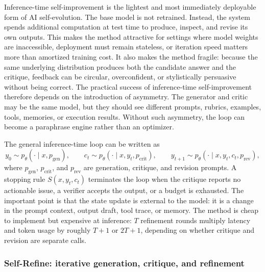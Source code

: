 Inference-time self-improvement is the lightest and most immediately deployable form of AI self-evolution. The base model is not retrained. Instead, the system spends additional computation at test time to produce, inspect, and revise its own outputs. This makes the method attractive for settings where model weights are inaccessible, deployment must remain stateless, or iteration speed matters more than amortized training cost. It also makes the method fragile: because the same underlying distribution produces both the candidate answer and the critique, feedback can be circular, overconfident, or stylistically persuasive without being correct. The practical success of inference-time self-improvement therefore depends on the introduction of asymmetry. The generator and critic may be the same model, but they should see different prompts, rubrics, examples, tools, memories, or execution results. Without such asymmetry, the loop can become a paraphrase engine rather than an optimizer.

The general inference-time loop can be written as
\begin{equation}
    y_0 \sim p_\theta(\cdot \mid x, p_{\mathrm{gen}}), \qquad
    c_t \sim p_\theta(\cdot \mid x, y_t, p_{\mathrm{crit}}), \qquad
    y_{t+1} \sim p_\theta(\cdot \mid x, y_t, c_t, p_{\mathrm{rev}}),
    \label{eq:inference-loop}
\end{equation}
where $p_{\mathrm{gen}}$, $p_{\mathrm{crit}}$, and $p_{\mathrm{rev}}$ are generation, critique, and revision prompts. A stopping rule $S(x,y_t,c_t)$ terminates the loop when the critique reports no actionable issue, a verifier accepts the output, or a budget is exhausted. The important point is that the state update is external to the model: it is a change in the prompt context, output draft, tool trace, or memory. The method is cheap to implement but expensive at inference: $T$ refinement rounds multiply latency and token usage by roughly $T+1$ or $2T+1$, depending on whether critique and revision are separate calls.

\subsubsection{Self-Refine: iterative generation, critique, and refinement}
\label{subsubsec:self-refine}

